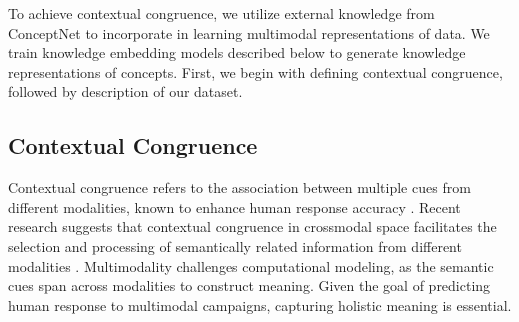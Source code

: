 

To achieve contextual congruence, we utilize external knowledge from ConceptNet to incorporate in learning multimodal representations of data. We train knowledge embedding models described below to generate knowledge representations of concepts. First, we begin with defining contextual congruence, followed by description of our dataset.



\subsection{Contextual Congruence}
\label{sec:context-congruence}

Contextual congruence refers to the association between
multiple cues from different modalities, known to enhance human response accuracy
\cite{laurienti2004semantic,spence2011crossmodal}. Recent research suggests that contextual congruence in crossmodal space facilitates the selection and processing of semantically related information from different modalities \cite{almadori2021crossmodal,laurienti2004semantic,letts2022evaluating}. 
Multimodality 
challenges computational modeling, as the semantic cues
span across modalities to construct meaning. 
Given the goal of predicting human response to multimodal campaigns, capturing holistic meaning is essential. 

